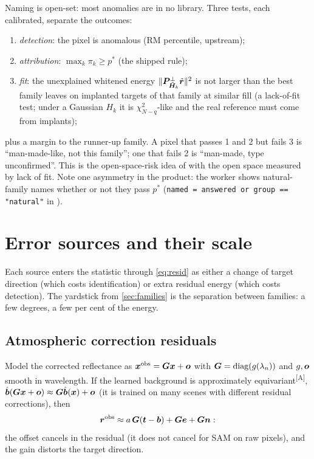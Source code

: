 \documentclass[11pt,a4paper]{article}
\theoremstyle{plain}
\theoremstyle{definition}
\theoremstyle{remark}
\newcommand{\x}{\B{x}}
\newcommand{\bvec}{\B{b}}
\newcommand{\bh}{\hat{\B{b}}}
\newcommand{\tv}{\B{t}}
\newcommand{\rv}{\B{r}}
\newcommand{\ev}{\B{e}}
\newcommand{\nv}{\B{n}}
\newcommand{\Hm}{\B{H}}
\newcommand{\Pm}{\B{P}}
\newcommand{\Gm}{\B{G}}
\newcommand{\nrm}[1]{\lVert #1\rVert}
\newcommand{\assm}{\textsuperscript{\textsf{\scriptsize[A]}}}
\begin{document}
Naming is open-set: most anomalies are in no library. Three tests, each calibrated, separate the outcomes:
\begin{enumerate}
\item \emph{detection}: the pixel is anomalous (RM percentile, upstream);
\item \emph{attribution}: $\max_k\pi_k\ge p^\ast$ (the shipped rule);
\item \emph{fit}: the unexplained whitened energy $\nrm{\Pm^\perp_{\tilde{\Hm}_k}\tilde{\rv}}^2$ is not larger than the best family
leaves on implanted targets of that family at similar fill (a lack-of-fit test; under a Gaussian $H_k$ it is
$\chi^2_{N-q}$-like and the real reference must come from implants);
\end{enumerate}
plus a margin to the runner-up family. A pixel that passes 1 and 2 but fails 3 is ``man-made-like, not this family'';
one that fails 2 is ``man-made, type unconfirmed''. This is the open-space-risk idea of \cite{Scheirer2013} with the open space
measured by lack of fit. Note one asymmetry in the product: the worker shows natural-family names whether or not they pass
$p^\ast$ (\verb|named = answered or group == "natural"| in ).

\section{Error sources and their scale}
\label{sec:errors}

Each source enters the statistic through \eqref{eq:resid} as either a change of target direction (which costs identification) or
extra residual energy (which costs detection). The yardstick from \cref{sec:families} is the separation between families: a few
degrees, a few per cent of the energy.

\subsection{Atmospheric correction residuals}

Model the corrected reflectance as $\x^{\rm obs}=\Gm\x+\B o$ with $\Gm=\operatorname{diag}(g(\lambda_n))$ and $g,\bm{o}$ smooth in
wavelength. If the learned background is approximately equivariant\assm, $\bh(\Gm\x+\B o)\approx\Gm\bh(\x)+\B o$ (it is trained on
many scenes with different residual corrections), then
\[
  \rv^{\rm obs}\approx a\,\Gm(\tv-\bvec)+\Gm\ev+\Gm\nv :
\]
the offset cancels in the residual (it does not cancel for SAM on raw pixels), and the gain distorts the target direction.
\end{document}
